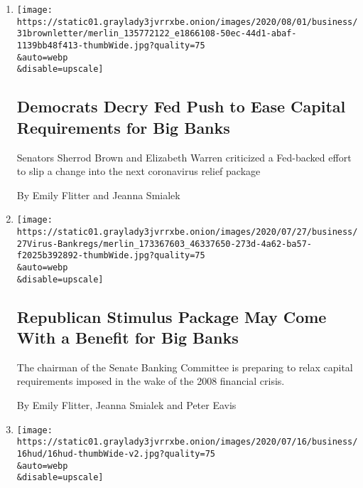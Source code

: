 \begin{enumerate}
\def\labelenumi{\arabic{enumi}.}
\item
  \href{/2020/07/31/business/democrats-fed-banks-capital-requirements.html}{}

  \texttt{[image: https://static01.graylady3jvrrxbe.onion/images/2020/08/01/business/31brownletter/merlin\_135772122\_e1866108-50ec-44d1-abaf-1139bb48f413-thumbWide.jpg?quality=75\\\&auto=webp\\\&disable=upscale]}

  \hypertarget{democrats-decry-fed-push-to-ease-capital-requirements-for-big-banks}{%
  \subsection{Democrats Decry Fed Push to Ease Capital Requirements for
  Big
  Banks}\label{democrats-decry-fed-push-to-ease-capital-requirements-for-big-banks}}

  Senators Sherrod Brown and Elizabeth Warren criticized a Fed-backed
  effort to slip a change into the next coronavirus relief package

  By Emily Flitter and Jeanna Smialek
\item
  \href{/2020/07/27/business/bank-regulations-rollback-stimulus-bill.html}{}

  \texttt{[image: https://static01.graylady3jvrrxbe.onion/images/2020/07/27/business/27Virus-Bankregs/merlin\_173367603\_46337650-273d-4a62-ba57-f2025b392892-thumbWide.jpg?quality=75\\\&auto=webp\\\&disable=upscale]}

  \hypertarget{republican-stimulus-package-may-come-with-a-benefit-for-big-banks}{%
  \subsection{Republican Stimulus Package May Come With a Benefit for
  Big
  Banks}\label{republican-stimulus-package-may-come-with-a-benefit-for-big-banks}}

  The chairman of the Senate Banking Committee is preparing to relax
  capital requirements imposed in the wake of the 2008 financial crisis.

  By Emily Flitter, Jeanna Smialek and Peter Eavis
\item
  \href{/2020/07/16/business/banks-housing-racial-discrimination.html}{}

  \texttt{[image: https://static01.graylady3jvrrxbe.onion/images/2020/07/16/business/16hud/16hud-thumbWide-v2.jpg?quality=75\\\&auto=webp\\\&disable=upscale]}


\end{enumerate}
